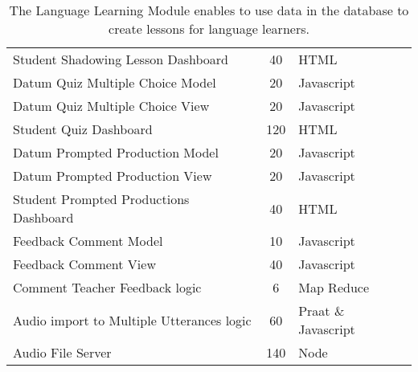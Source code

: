 \documentclass[12pt]{article} %
\begin{document}
\begin{table}[htbp]
\begin{center}
\begin{tabular}{ | lcl | }
Student Shadowing Lesson Dashboard &  40 & HTML \\ 
Datum Quiz Multiple Choice Model  & 20  & Javascript \\ 
Datum Quiz Multiple Choice View  &  20  & Javascript \\ 
Student Quiz Dashboard  & 120  & HTML \\ 
Datum Prompted Production Model  & 20  & Javascript \\ 
Datum Prompted Production View  & 20  & Javascript \\ 
Student Prompted Productions Dashboard  &  40  & HTML \\ 
Feedback Comment Model  & 10  & Javascript \\ 
Feedback Comment View  & 40  & Javascript \\ 
Comment Teacher Feedback logic & 6  & Map Reduce \\ 
Audio import to Multiple Utterances logic   & 60  & Praat \& Javascript \\ 
Audio File Server  & 140  & Node \\ 
\hline
  \end{tabular}
 \caption{The Language Learning Module enables to use data in the database to create lessons for language learners.  }
  \label{tab:langlearn}
  \end{center}
\end{table}
\end{document}
